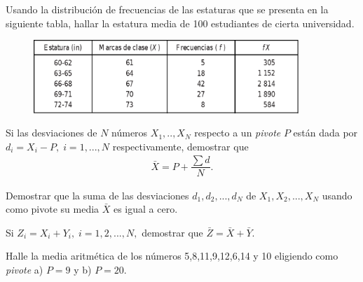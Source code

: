  \begin{problema}
  \label{problema:3.15}

  Usando la distribución de frecuencias de las estaturas que se presenta en la siguiente tabla, hallar la estatura media de 100 estudiantes de cierta universidad.
   \begin{figure}
  \centering
  \includegraphics[width=10cm,keepaspectratio=true]{./images/tab0301.png}
  \label{tab:0301}
 \end{figure}
 \end{problema}

 

 
 \begin{problema}
 	\label{problema:3.18}
  Si las desviaciones de $N$ números $X_{1},..,X_{N}$ respecto a un \emph{pivote} $P$ están dada por $d_{i}=X_{i}-P, \; i=1,...,N$ respectivamente, demostrar que
  \begin{align}
 \bar{X}=P+\dfrac{\sum d}{N}.
 \end{align}
 \end{problema}

 
 
 \begin{problema}
 	\label{problema:3.16}
  Demostrar que la suma de las desviaciones $d_{1},d_{2},...,d_{N}$ de $X_{1},X_{2},...,X_{N}$ usando como pivote su media $\bar{X}$ es igual a cero.
 \end{problema}

 
 
 \begin{problema}
 	\label{problema:3.17}
  Si $Z_{i}=X_{i}+Y_{i}, \; i=1,2,...,N,$ demostrar que $\bar{Z}=\bar{X}+\bar{Y}.$
 \end{problema}

 

 
 \begin{problema}
  \label{problema:3.19}
  Halle la media aritmética de los números 5,8,11,9,12,6,14 y 10 eligiendo como \emph{pivote} a) $P=9$ y b) $P=20.$
 \end{problema}

